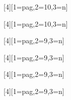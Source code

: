 \newcommand{\fhv}[2]{{\fontfamily{pag}\fontsize{#1}{1}\selectfont{#2}}}

\newcommand{\fhvb}[2]{{\fontfamily{pag}\fontseries{b}\fontsize{#1}{1}\selectfont{#2}}}

[4][1=pag,2=10,3=n]{{\fontsize{#2}{1}\selectfont{#4}}}

[4][1=pag,2=10,3=n]{{\color{azulF}\fontsize{#2}{1}\selectfont{#4}}}

[4][1=pag,2=9,3=n]{{\fontsize{#2}{1}\selectfont{#4}}}

[4][1=pag,2=9,3=n]{{\red{}\fontsize{#2}{1}\selectfont{#4}}}

[4][1=pag,2=9,3=n]{{\fontsize{#2}{1}\selectfont{#4}}}

\newcommand{\wfont}[2]{{\fontfamily{#1}\selectfont{#2}}}
\newcommand{\fptm}[1]{{\fontfamily{ptm}\selectfont{#1}}}

[4][1=pag,2=9,3=n]{{\wcelestetxt{}\fontsize{#2}{1}\selectfont{#4}}}

\makeatletter
\renewcommand{\cleardoublepage}{
\clearpage\ifodd\c@page\else
\hbox{}
\vspace*{\fill}
\thispagestyle{empty}
\newpage
\fi}
\makeatother

\usepackage{fancyhdr}
\usepackage[absolute]{textpos}
    \setlength{\TPHorizModule}{10mm}%
    \setlength{\TPVertModule}{10mm}%
    \textblockorigin{0mm}{0mm}%

\makeatletter
\renewcommand{\chaptermark}[1]{\markboth{\if@mainmatter\ ~~\fi#1}{}}
\makeatother

